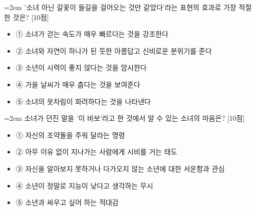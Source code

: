 \documentclass[12pt,a4paper]{article}
\newcommand{\qnum}[1]{%
  \tikz[baseline=(num.base)]{%
    \node[circle, fill=numCircle, text=white, inner sep=0pt,
          minimum size=18pt, font=\small\bfseries] (num) {#1};%
  }%
}
\newcommand{\pts}[1]{%
  \hfill\textcolor{ptsBadge}{[#1점]}%
}
\begin{document}
\vspace{4mm}
\begin{minipage}{\columnwidth}
{\hangindent=2em
\qnum{20}\enspace '소녀 아닌 갈꽃이 들길을 걸어오는 것만 같았다'라는 표현의 효과로 가장 적절한 것은? \pts{10}
\par}

\vspace{3mm}
\begin{itemize}[leftmargin=2.5em, labelsep=0.3em, label={}, itemsep=4pt, parsep=1pt, topsep=0pt]
  \item ① 소녀가 걷는 속도가 매우 빠르다는 것을 강조한다
  \item ② 소녀와 자연이 하나가 된 듯한 아름답고 신비로운 분위기를 준다
  \item ③ 소년이 시력이 좋지 않다는 것을 암시한다
  \item ④ 가을 날씨가 매우 춥다는 것을 보여준다
  \item ⑤ 소녀의 옷차림이 화려하다는 것을 나타낸다
\end{itemize}
\end{minipage}
\vspace{4mm}

\vspace{4mm}
\begin{minipage}{\columnwidth}
{\hangindent=2em
\qnum{21}\enspace 소녀가 던진 말을 '이 바보'라고 한 것에서 알 수 있는 소녀의 마음은? \pts{10}
\par}

\vspace{3mm}
\begin{itemize}[leftmargin=2.5em, labelsep=0.3em, label={}, itemsep=4pt, parsep=1pt, topsep=0pt]
  \item ① 자신의 조약돌을 주워 달라는 명령
  \item ② 아무 이유 없이 지나가는 사람에게 시비를 거는 태도
  \item ③ 자신을 알아보지 못하거나 다가오지 않는 소년에 대한 서운함과 관심
  \item ④ 소년이 정말로 지능이 낮다고 생각하는 무시
  \item ⑤ 소년과 싸우고 싶어 하는 적대감
\end{itemize}
\end{minipage}
\vspace{4mm}
\end{document}
